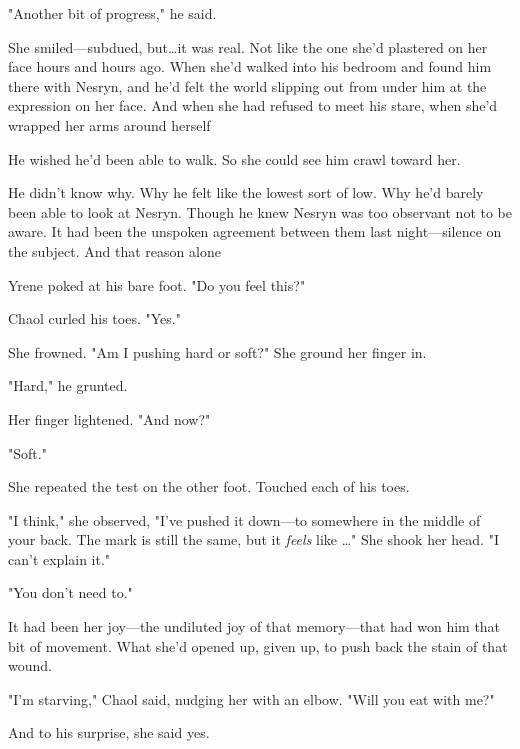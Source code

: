 "Another bit of progress," he said.

She smiled---subdued, but\ldots it was real.
Not like the one she'd plastered on her face hours and hours ago.
When she'd walked into his bedroom and found him there with Nesryn, and he'd felt the world slipping out from under him at the expression on her face.
And when she had refused to meet his stare, when she'd wrapped her arms around herself 

He wished he'd been able to walk.
So she could see him crawl toward her.

He didn't know why.
Why he felt like the lowest sort of low.
Why he'd barely been able to look at Nesryn.
Though he knew Nesryn was too observant not to be aware.
It had been the unspoken agreement between them last night---silence on the subject.
And that reason alone 

Yrene poked at his bare foot.
"Do you feel this?"

Chaol curled his toes.
"Yes."

She frowned.
"Am I pushing hard or soft?"
She ground her finger in.

"Hard," he grunted.

Her finger lightened.
"And now?"

"Soft."

She repeated the test on the other foot.
Touched each of his toes.

"I think," she observed, "I've pushed it down---to somewhere in the middle of your back.
The mark is still the same, but it \emph{feels} like \ldots" She shook her head.
"I can't explain it."

"You don't need to."

It had been her joy---the undiluted joy of that memory---that had won him that bit of movement.
What she'd opened up, given up, to push back the stain of that wound.

"I'm starving," Chaol said, nudging her with an elbow.
"Will you eat with me?"

And to his surprise, she said yes.

